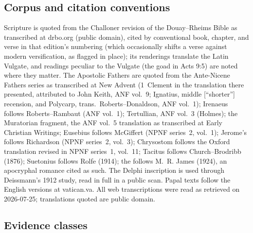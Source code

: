\subsection{Corpus and citation conventions}

Scripture is quoted from the Challoner revision of the Douay--Rheims
Bible as transcribed at drbo.org (public domain), cited by conventional
book, chapter, and verse in that edition's numbering (which occasionally
shifts a verse against modern versification, as flagged in place); its
renderings translate the Latin Vulgate, and readings peculiar to the
Vulgate (the goad in Acts 9:5) are noted where they matter. The Apostolic
Fathers are quoted from the Ante-Nicene Fathers series as transcribed at
New Advent (1~Clement in the translation there presented, attributed to
John Keith, ANF vol.~9; Ignatius, middle [``shorter''] recension, and
Polycarp, trans.\ Roberts--Donaldson, ANF vol.~1); Irenaeus follows
Roberts--Rambaut (ANF vol.~1); Tertullian, ANF vol.~3 (Holmes); the
Muratorian fragment, the ANF vol.~5 translation as transcribed at Early
Christian Writings; Eusebius follows McGiffert (NPNF series~2, vol.~1);
Jerome's  follows Richardson (NPNF series~2,
vol.~3); Chrysostom follows the Oxford translation revised in NPNF
series~1, vol.~11; Tacitus follows Church--Brodribb (1876); Suetonius
follows Rolfe (1914); the  follows M.~R. James (1924),
an apocryphal romance cited as such. The Delphi inscription is used
through Deissmann's 1912 study, read in full in a public scan. Papal
texts follow the English versions at vatican.va. All web transcriptions
were read as retrieved on 2026-07-25; translations quoted are public
domain.

\subsection{Evidence classes}

